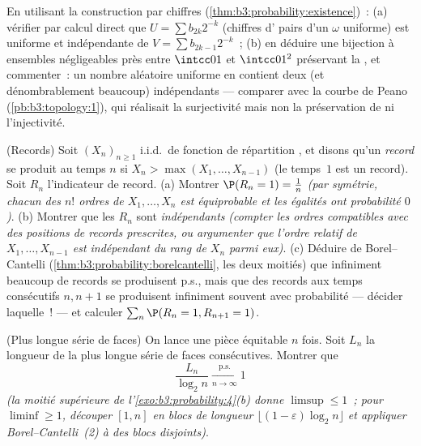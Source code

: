 \begin{exercise}[$\star\star$]\label{exo:b3:probability:10}
En utilisant la construction par chiffres
(\cref{thm:b3:probability:existence})~:
(a) vérifier par calcul direct que $U = \sum b_{2k}2^{-k}$
(chiffres d' pairs d'un $\omega$ uniforme) est
uniforme et indépendante de $V = \sum
b_{2k-1}2^{-k}$~;
(b) en déduire une bijection  à ensembles
négligeables près entre $\intcc01$ et $\intcc01^2$
préservant la , et commenter~: un nombre aléatoire
uniforme en contient deux (et dénombrablement beaucoup)
indépendants --- comparer avec la courbe de Peano
(\cref{pb:b3:topology:1}), qui réalisait la surjectivité
mais non la préservation de  ni l'injectivité.
\end{exercise}

\begin{exercise}[$\star\star$]\label{exo:b3:probability:11}
(Records) Soit $(X_n)_{n\geq1}$ i.i.d.\ de fonction de
répartition , et disons qu'un \emph{record} se
produit au temps $n$ si $X_n > \max(X_1, \dots, X_{n-1})$
(le temps~$1$ est un record). Soit $R_n$ l'indicateur de
record.
(a) Montrer $\P(R_n = 1) = \frac1n$ \emph{(par symétrie,
chacun des $n!$ ordres de $X_1, \dots, X_n$ est
équiprobable et les égalités ont probabilité $0$)}.
(b) Montrer que les $R_n$ sont \emph{indépendants}
\emph{(compter les ordres compatibles avec des positions de
records prescrites, ou argumenter que l'ordre relatif de
$X_1, \dots, X_{n-1}$ est indépendant du rang de $X_n$ parmi
eux)}.
(c) Déduire de Borel--Cantelli
(\cref{thm:b3:probability:borelcantelli}, les deux moitiés)
que infiniment beaucoup de records se produisent p.s., mais
que des records aux temps consécutifs $n, n+1$ se produisent
infiniment souvent avec probabilité --- décider laquelle~!
--- et calculer $\sum_n\P(R_n = 1, R_{n+1} = 1)$.
\end{exercise}

\begin{exercise}[$\star\star$]\label{exo:b3:probability:12}
(Plus longue série de faces) On lance une pièce équitable
$n$ fois. Soit $L_n$ la longueur de la plus longue série de
faces consécutives. Montrer que
\[
\frac{L_n}{\log_2 n} \xrightarrow[n\to\infty]{\text{p.s.}} 1
\]
\emph{(la moitié supérieure de
l'\cref{exo:b3:probability:4}(b) donne $\limsup \leq 1$~;
pour $\liminf \geq 1$, découper $[1, n]$ en blocs de
longueur $\lfloor(1-\varepsilon)\log_2 n\rfloor$ et
appliquer Borel--Cantelli~(2) à des blocs disjoints)}.
\end{exercise}

